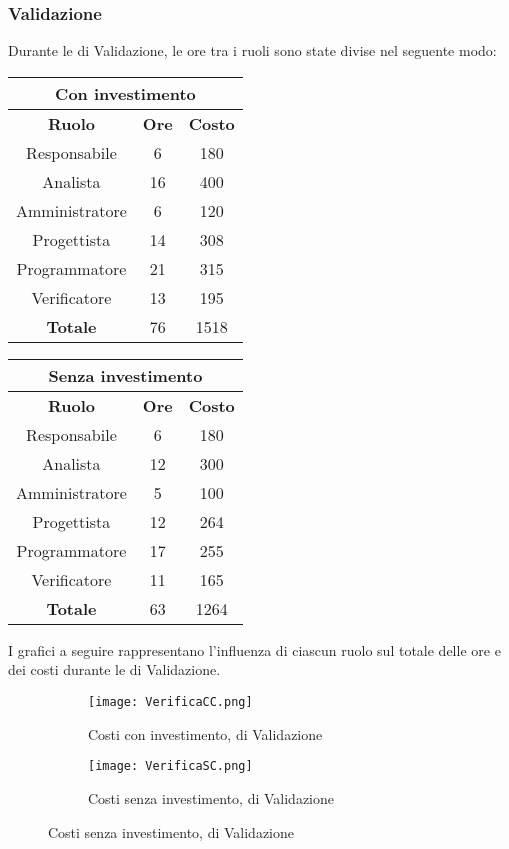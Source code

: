 \documentclass{scalatekids-article}
\begin{document}
\subsubsection{Validazione}
Durante le  di Validazione, le ore tra i ruoli sono state divise nel seguente modo:
\begin{center}
  \normalsize
  \begin{tabular}{| c | c | c |}
    \hline
    \multicolumn{3}{|c|}{\textbf{Con investimento}}\\
    \hline
    \textbf{Ruolo} & \textbf{Ore} & \textbf{Costo}\\
    \hline
    Responsabile & 6 & 180 \\
    Analista & 16 & 400\\
    Amministratore & 6 & 120\\
    Progettista & 14 & 308\\
    Programmatore & 21 & 315\\
    Verificatore & 13 & 195\\
    \hline
    \textbf{Totale} & 76 & 1518\\
    \hline
  \end{tabular}
  \qquad
  \begin{tabular}{| c | c | c |}
    \hline
    \multicolumn{3}{|c|}{\textbf{Senza investimento}}\\
    \hline
    \textbf{Ruolo} & \textbf{Ore} & \textbf{Costo}\\
    \hline
    Responsabile & 6 & 180\\
    Analista & 12 & 300\\
    Amministratore & 5 & 100\\
    Progettista & 12 & 264\\
    Programmatore & 17 & 255\\
    Verificatore & 11 & 165\\
    \hline
    \textbf{Totale} & 63 & 1264\\
    \hline
  \end{tabular}
\end{center}
I grafici a seguire rappresentano l'influenza di ciascun ruolo sul totale delle ore e dei costi durante le  di Validazione.
\begin{figure}[H]
  \begin{subfigure}[H]{0.47\textwidth}
    \texttt{[image: VerificaCC.png]}
    \caption*{Costi con investimento,  di Validazione}
  \end{subfigure}
  \qquad
  \begin{subfigure}[H]{0.47\textwidth}
    \texttt{[image: VerificaSC.png]}
    \caption*{Costi senza investimento,  di Validazione}
  \end{subfigure}
\end{figure}
\newpage
\end{document}
